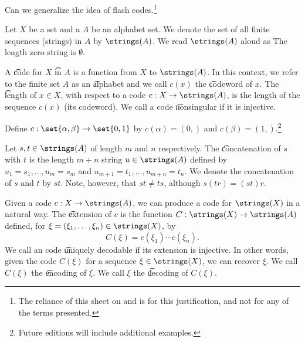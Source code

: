 

Can we generalize the idea of flash codes.\footnote{The reliance of this sheet on  and  is for this justification, and not for any of the terms presented.}


Let $X$ be a set and a $A$ be an alphabet set.
We denote the set of all finite sequences (strings) in $A$ by $\strings(A)$.
We read $\strings(A)$ aloud as 
The length zero string is $\emptyset$.

A \t{code} for $X$ \t{in} $A$ is a function from $X$ to $\strings(A)$.
In this context, we refer to the finite set $A$ as an \t{alphabet} and we call $c(x)$ the \t{codeword} of $x$.
The \t{length} of $x \in X$, with respect to a code $c: X \to \strings(A)$, is the length of the sequence $c(x)$ (its codeword).
We call a code \t{nonsingular} if it is injective.


Define $c: \set{\alpha, \beta} \to \set{0, 1}$ by $c(\alpha) = (0,)$ and $c(\beta) = (1,)$.\footnote{Future editions will include additional examples.}



Let $s,t \in \strings(A)$ of length $m$  and $n$ respectively.
The \t{concatenation} of $s$ with $t$ is the length $m+n$ string $u \in \strings(A)$ defined by $u_{1} = s_1, \dots, u_m = s_m$ and $u_{m+1} = t_1, \dots, u_{m+n} = t_n$.
We denote the concatenation of $s$ and $t$ by $st$.
Note, however, that $st \neq ts$, although $s(tr) = (st)r$.

Given a code $c: X \to \strings(A)$, we can produce a code for $\strings(X)$ in a natural way.
The \t{extension} of $c$ is the function $C: \strings(X) \to \strings(A)$ defined, for $\xi = (\xi_1, \dots, \xi_n) \in \strings(X)$, by
\[
  C(\xi) = c(\xi_1) \cdots c(\xi_n).
\]
We call an code \t{uniquely decodable} if its extension is injective.
In other words, given the code $C(\xi)$ for a sequence $\xi \in \strings(X)$, we can recover $\xi$.
We call $C(\xi)$ the \t{encoding} of $\xi$.
We call $\xi$ the \t{decoding} of $C(\xi)$.

